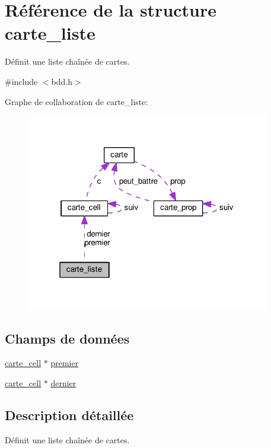 \hypertarget{structcarte__liste}{}\section{Référence de la structure carte\+\_\+liste}
\label{structcarte__liste}


Définit une liste chaînée de cartes.  




{\ttfamily \#include $<$bdd.\+h$>$}



Graphe de collaboration de carte\+\_\+liste\+:
\nopagebreak
\begin{figure}[H]
\begin{center}
\leavevmode
\includegraphics[width=301pt]{structcarte__liste__coll__graph}
\end{center}
\end{figure}
\subsection*{Champs de données}
\begin{DoxyCompactItemize}
\item 
\hyperlink{structcarte__cell}{carte\+\_\+cell} $\ast$ \hyperlink{structcarte__liste_aab2e8cf4d231e6f335d4dc99343d1421}{premier}
\item 
\hyperlink{structcarte__cell}{carte\+\_\+cell} $\ast$ \hyperlink{structcarte__liste_abeffe6f9b0cfe0111b785b92ac2af410}{dernier}
\end{DoxyCompactItemize}


\subsection{Description détaillée}
Définit une liste chaînée de cartes. 

